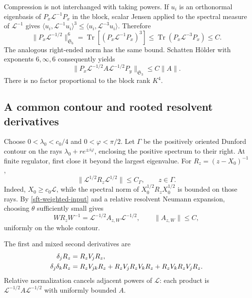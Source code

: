 \documentclass[11pt]{article}
\theoremstyle{remark}
\begin{document}
Compression is not interchanged with taking powers. If \(u_i\) is
an orthonormal eigenbasis of \(P_x\mathcal L^{-1}P_x\) in the block,
scalar Jensen applied to the spectral measure of \(\mathcal L^{-1}\)
gives
\(\langle u_i,\mathcal L^{-1}u_i\rangle^3
 \le\langle u_i,\mathcal L^{-3}u_i\rangle\).
Therefore
\begin{equation}
 \|P_x\mathcal L^{-1/2}\|_{\mathfrak S_6}^6
 =\operatorname{Tr}[(P_x\mathcal L^{-1}P_x)^3]
 \le\operatorname{Tr}(P_x\mathcal L^{-3}P_x)\le C.
 \label{sft-s6}
\end{equation}
The analogous right-ended norm has the same bound. Schatten
Hölder with exponents \(6,\infty,6\) consequently yields
\begin{equation}
 \|P_x\mathcal L^{-1/2}A\mathcal L^{-1/2}P_y\|_{\mathfrak S_3}
 \le C\|A\|.
 \label{sft-s3}
\end{equation}
There is no factor proportional to the block rank \(K^4\).

\subsection{A common contour and rooted resolvent derivatives}
\label{sft-resolvent-section}

Choose \(0<\lambda_0<c_0/4\) and \(0<\varphi<\pi/2\).
Let \(\Gamma\) be the positively oriented Dunford contour on the
rays \(\lambda_0+r e^{\pm i\varphi}\), enclosing the positive
spectrum to their right. At finite regulator, first close it beyond
the largest eigenvalue. For \(R_z=(z-X_0)^{-1}\),
\begin{equation}
 \|\mathcal L^{1/2}R_z\mathcal L^{1/2}\|\le C_\Gamma,
 \qquad z\in\Gamma .
 \label{sft-contour-bound}
\end{equation}
Indeed, \(X_0\ge c_0\mathcal L\), while the spectral norm of
\(X_0^{1/2}R_zX_0^{1/2}\) is bounded on those rays.
By \eqref{sft-weighted-input} and a relative resolvent Neumann
expansion, choosing \(\theta\) sufficiently small gives
\begin{equation}
 WR_zW^{-1}=\mathcal L^{-1/2}A_{z,W}\mathcal L^{-1/2},
 \qquad \|A_{z,W}\|\le C ,
 \label{sft-twisted-resolvent}
\end{equation}
uniformly on the whole contour.

The first and mixed second derivatives are
\begin{align}
 \delta_jR_z&=R_zV_jR_z,\notag\\
 \delta_j\delta_kR_z
  &=R_zV_{jk}R_z+R_zV_jR_zV_kR_z+R_zV_kR_zV_jR_z.
 \label{sft-resolvent-derivatives}
\end{align}
Relative normalization cancels adjacent powers of \(\mathcal L\):
each product is \(\mathcal L^{-1/2}A\mathcal L^{-1/2}\)
with uniformly bounded \(A\).
\end{document}
